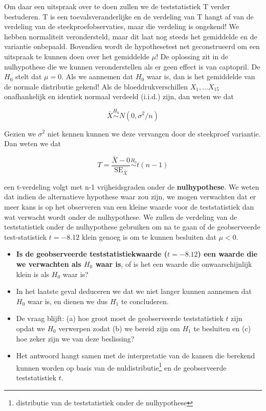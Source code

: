 \documentclass[
  12pt,dutch,coursenotes]{book}
\providecommand{\tightlist}{%
  \setlength{\itemsep}{0pt}\setlength{\parskip}{0pt}}
\theoremstyle{definition}
\theoremstyle{definition}
\theoremstyle{definition}
\theoremstyle{definition}
\theoremstyle{remark}
\begin{document}
Om daar een uitspraak over te doen zullen we de teststatistiek T verder bestuderen.
T is een toevalsveranderlijke en de verdeling van T hangt af van de verdeling van de steekproefobservaties, maar die verdeling is ongekend!
We hebben normaliteit verondersteld, maar dit laat nog steeds het gemiddelde en de variantie onbepaald.
Bovendien wordt de hypothesetest net geconstrueerd om een uitspraak te kunnen doen over het gemiddelde \(\mu\)!
De oplossing zit in de nulhypothese die we kunnen veronderstellen als er geen effect is van captopril.
De \(H_0\) stelt dat \(\mu=0\).
Als we aannemen dat \(H_0\) waar is, dan is het gemiddelde van de normale distributie gekend!
Als de bloeddrukverschillen \(X_1, \ldots X_{15}\) onafhankelijk en identiek normaal verdeeld (i.i.d.) zijn, dan weten we dat

\[\bar X  \stackrel{H_0}{\sim} N(0, \sigma^2/n)\]

Gezien we \(\sigma^2\) niet kennen kunnen we deze vervangen door de steekproef variantie. Dan weten we dat

\[T=\frac{\bar{X}-0}{\text{SE}_{\bar X}}\stackrel{H_0}{\sim} t(n-1) \]

een t-verdeling volgt met n-1 vrijheidsgraden onder de \textbf{nulhypothese}.
We weten dat indien de alternatieve hypothese waar zou zijn, we mogen verwachten dat er meer kans is op het observeren van een kleine waarde voor de teststatistiek dan wat verwacht wordt onder de nulhypothese.
We zullen de verdeling van de teststatistiek onder de nulhypothese gebruiken om na te gaan of de geobserveerde test-statistiek \(t = -8.12\) klein genoeg is om te kunnen besluiten dat \(\mu < 0\).

\begin{itemize}
\tightlist
\item
  \textbf{Is de geobserveerde teststatistiekwaarde (\(t=-8.12\)) een waarde die we verwachten als \(H_0\) waar is}, of is het een waarde die onwaarschijnlijk klein is als \(H_0\) waar is?
\item
  In het laatste geval deduceren we dat we niet langer kunnen aannemen dat \(H_0\) waar is, en dienen we dus \(H_1\) te concluderen.
\item
  De vraag blijft: (a) hoe groot moet de geobserveerde teststatistiek \(t\) zijn opdat we \(H_0\) verwerpen zodat (b) we bereid zijn om \(H_1\) te besluiten en (c) hoe zeker zijn we van deze beslissing?
\item
  Het antwoord hangt samen met de interpretatie van de kansen die berekend kunnen worden op basis van de nuldistributie\footnote{distributie van de teststatistiek onder de nulhypothese} en de geobserveerde teststatistiek \(t\).
\end{itemize}
\end{document}
